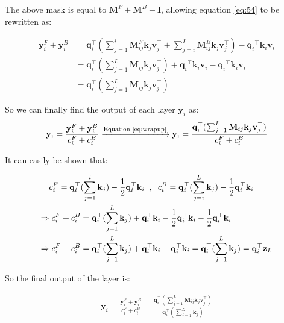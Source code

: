 The above mask is equal to \(\mathbf{M}^F + \mathbf{M}^B -\mathbf{I}\), allowing equation \eqref{eq:54} to be rewritten as:

\begin{align}
    \mathbf{y}^{F}_i + \mathbf{y}^{B}_i &=
     \mathbf{q}^{\top}_i(\sum_{j=1}^i \mathbf{M}^{F}_{ij}\mathbf{k}_j\mathbf{v}^{\top}_j + \sum_{j=i}^L \mathbf{M}^{B}_{ij}\mathbf{k}_j\mathbf{v}^{\top}_j)  - {{\mathbf{q}_i}}^{\top} \mathbf{k}_i \mathbf{v}_i \\ 
    & = \mathbf{q}^{\top}_i(\sum_{j=1}^L \mathbf{M}_{ij}\mathbf{k}_j\mathbf{v}^{\top}_j) +  {{\mathbf{q}_i}}^{\top} \mathbf{k}_i \mathbf{v}_i - {{\mathbf{q}_i}}^{\top} \mathbf{k}_i \mathbf{v}_i \\
    & = \mathbf{q}^{\top}_i(\sum_{j=1}^L \mathbf{M}_{ij}\mathbf{k}_j\mathbf{v}^{\top}_j) 
    \label{eq:wrapup}
\end{align}

So we can finally find the output of each layer $\mathbf{y}_i $ as:
\begin{align}
\label{eq:dumm2}
    \mathbf{y}_i = \frac{\mathbf{y}^{F}_i + \mathbf{y}^{B}_i}{c^F_i + c^B_i }
    \xrightarrow{\text{Equation \eqref{eq:wrapup}}} \mathbf{y}_i = \frac{\mathbf{q}^{\top}_i(\sum_{j=1}^L \mathbf{M}_{ij}\mathbf{k}_j\mathbf{v}^{\top}_j)}{c^F_i + c^B_i } 
\end{align}

It can easily be shown that:

\begin{align}
    c^F_i = \mathbf{q}^{\top}_i & (\sum^i_{j=1} \mathbf{k}_j) - \frac{1}{2}\mathbf{q}^{\top}_i\mathbf{k}_i \hspace{2mm} , \hspace{2mm}  c^B_i = \mathbf{q}^{\top}_i (\sum^L_{j=i} \mathbf{k}_j) - \frac{1}{2}\mathbf{q}^{\top}_i\mathbf{k}_i \\
    \Rightarrow c^F_i + c^B_i &= \mathbf{q}^{\top}_i (\sum^L_{j=1} \mathbf{k}_j) +  \mathbf{q}^{\top}_i\mathbf{k}_i - \frac{1}{2}\mathbf{q}^{\top}_i\mathbf{k}_i - \frac{1}{2}\mathbf{q}^{\top}_i\mathbf{k}_i \\
     \Rightarrow c^F_i + c^B_i & = \mathbf{q}^{\top}_i (\sum^L_{j=1} \mathbf{k}_j) +  \mathbf{q}^{\top}_i\mathbf{k}_i - \mathbf{q}^{\top}_i\mathbf{k}_i =  \mathbf{q}^{\top}_i (\sum^L_{j=1} \mathbf{k}_j)
     = \mathbf{q}^{\top}_i \mathbf{z}_L
\end{align}

So the final output of the layer is:

\begin{align}
\label{eq:finalyay}
    \mathbf{y}_i = \frac{\mathbf{y}^{F}_i + \mathbf{y}^{B}_i}{c^F_i + c^B_i } = \frac{\mathbf{q}^{\top}_i(\sum_{j=1}^L \mathbf{M}_{ij}\mathbf{k}_j\mathbf{v}^{\top}_j)}{\mathbf{q}^{\top}_i (\sum^L_{j=1} \mathbf{k}_j)}
\end{align}

